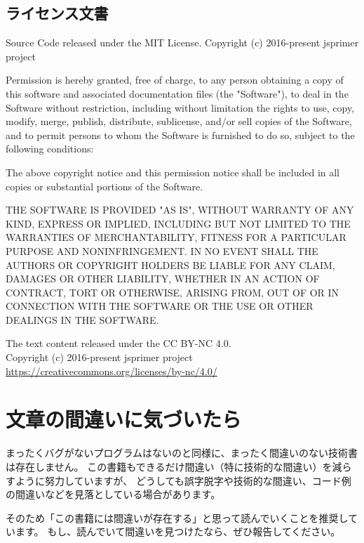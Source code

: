\subsection*{ライセンス文書}

Source Code released under the MIT License.
Copyright (c) 2016-present jsprimer project

Permission is hereby granted, free of charge, to any person obtaining a copy
of this software and associated documentation files (the "Software"), to deal
in the Software without restriction, including without limitation the rights
to use, copy, modify, merge, publish, distribute, sublicense, and/or sell
copies of the Software, and to permit persons to whom the Software is
furnished to do so, subject to the following conditions:

The above copyright notice and this permission notice shall be included in all
copies or substantial portions of the Software.

THE SOFTWARE IS PROVIDED "AS IS", WITHOUT WARRANTY OF ANY KIND, EXPRESS OR
IMPLIED, INCLUDING BUT NOT LIMITED TO THE WARRANTIES OF MERCHANTABILITY,
FITNESS FOR A PARTICULAR PURPOSE AND NONINFRINGEMENT. IN NO EVENT SHALL THE
AUTHORS OR COPYRIGHT HOLDERS BE LIABLE FOR ANY CLAIM, DAMAGES OR OTHER
LIABILITY, WHETHER IN AN ACTION OF CONTRACT, TORT OR OTHERWISE, ARISING FROM,
OUT OF OR IN CONNECTION WITH THE SOFTWARE OR THE USE OR OTHER DEALINGS IN THE
SOFTWARE.

\noindent\hrulefill\hspace*{65mm}

\noindent The text content released under the CC BY-NC 4.0.\\
Copyright (c) 2016-present jsprimer project\\
\url{https://creativecommons.org/licenses/by-nc/4.0/}

\hypertarget{how-to-report-mistake}{%
\section*{文章の間違いに気づいたら}\label{how-to-report-mistake}}

まったくバグがないプログラムはないのと同様に、まったく間違いのない技術書は存在しません。
この書籍もできるだけ間違い（特に技術的な間違い）を減らすように努力していますが、
どうしても誤字脱字や技術的な間違い、コード例の間違いなどを見落としている場合があります。

そのため「この書籍には間違いが存在する」と思って読んでいくことを推奨しています。
もし、読んでいて間違いを見つけたなら、ぜひ報告してください。

